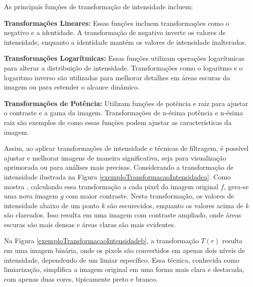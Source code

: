 As principais funções de transformação de intensidade incluem:

\textbf{Transformações Lineares:} Essas funções incluem transformações como o negativo e a identidade. A transformação de negativo inverte os valores de intensidade, enquanto a identidade mantém os valores de intensidade inalterados.

\textbf{Transformações Logarítmicas:} Essas funções utilizam operações logarítmicas para alterar a distribuição de intensidade. Transformações como o logaritmo e o logaritmo inverso são utilizadas para melhorar detalhes em áreas escuras da imagem ou para estender o alcance dinâmico.

\textbf{Transformações de Potência:} Utilizam funções de potência e raiz para ajustar o contraste e a gama da imagem. Transformações de n-ésima potência e n-ésima raiz são exemplos de como essas funções podem ajustar as características da imagem.

Assim, ao aplicar transformações de intensidade e técnicas de filtragem, é possível ajustar e melhorar imagens de maneira significativa, seja para visualização aprimorada ou para análises mais precisas.
Considerando a transformação de intensidade ilustrada na Figura \ref{exemploTransformacaoIntensidadea}. Como mostra , calculando essa transformação a cada pixel da imagem original $f$, gera-se uma nova imagem $g$ com maior contraste. Nesta transformação, os valores de intensidade abaixo de um ponto $k$ são escurecidos, enquanto os valores acima de $k$ são clareados. Isso resulta em uma imagem com contraste ampliado, onde áreas escuras são mais densas e áreas claras são mais evidentes.

Na Figura \ref{exemploTransformacaoIntensidadeb}, a transformação $T(r)$ resulta em uma imagem binária, onde os pixels são convertidos em apenas dois níveis de intensidade, dependendo de um limiar específico. Essa técnica, conhecida como limiarização, simplifica a imagem original em uma forma mais clara e destacada, com apenas duas cores, tipicamente preto e branco.






